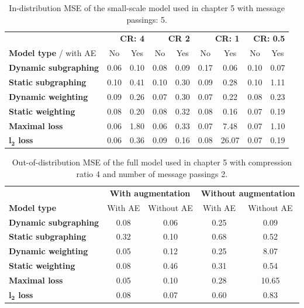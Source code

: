 \documentclass[12pt,a4paper]{report}
\begin{document}
\begin{appendices}
\begin{table}[H]
\centering
\caption{In-distribution MSE of the small-scale model used in chapter 5 with message passings: 5.}
\label{table_in_distribution_5}
\begin{tabular}{lcccccccc}
\toprule
 & \multicolumn{2}{r}{\textbf{CR: 4}} & \multicolumn{2}{r}{\textbf{CR 2}} & \multicolumn{2}{r}{\textbf{CR: 1}} & \multicolumn{2}{r}{\textbf{CR: 0.5}} \\
 \cmidrule{2-9}
\textbf{Model type} / with AE & No & Yes & No & Yes & No & Yes & No & Yes \\
\midrule
\textbf{Dynamic subgraphing} & 0.06 & 0.10 & 0.08 & 0.09 & 0.17 & 0.06 & 0.10 & 0.07 \\
\textbf{Static subgraphing} & 0.10 & 0.41 & 0.10 & 0.30 & 0.09 & 0.28 & 0.10 & 1.11 \\
\textbf{Dynamic weighting} & 0.09 & 0.26 & 0.07 & 0.30 & 0.07 & 0.22 & 0.08 & 0.23 \\
\textbf{Static weighting} & 0.08 & 0.20 & 0.08 & 0.32 & 0.08 & 0.16 & 0.07 & 0.19 \\
\textbf{Maximal loss} & 0.06 & 1.80 & 0.06 & 0.33 & 0.07 & 7.48 & 0.07 & 1.10 \\
\textbf{$\boldsymbol{l_2}$ loss} & 0.06 & 0.36 & 0.09 & 0.16 & 0.08 & 26.07 & 0.07 & 0.19 \\
\bottomrule
\end{tabular}
\end{table}

\begin{table}
\centering
\caption{Out-of-distribution MSE of the full model used in chapter 5 with compression ratio 4 and number of message passings 2.}
\label{table_4_2}
\begin{tabular}{lcccc}
\toprule
 & \multicolumn{2}{c}{\textbf{With augmentation}} & \multicolumn{2}{c}{\textbf{Without augmentation}} \\
 \cmidrule{2-3} \cmidrule{4-5}
\textbf{Model type} & With AE & Without AE & With AE & Without AE \\
\midrule
\textbf{Dynamic subgraphing} & 0.08 & 0.06 & 0.25 & 0.09 \\
\textbf{Static subgraphing} & 0.32 & 0.10 & 0.68 & 0.52 \\
\textbf{Dynamic weighting} & 0.05 & 0.12 & 0.25 & 8.07 \\
\textbf{Static weighting} & 0.08 & 0.46 & 0.31 & 0.54 \\
\textbf{Maximal loss} & 0.05 & 0.10 & 0.28 & 10.65 \\
\textbf{$\boldsymbol{l_2}$ loss} & 0.08 & 0.07 & 0.60 & 0.83 \\
\bottomrule
\end{tabular}
\end{table}


\end{appendices}
\end{document}
